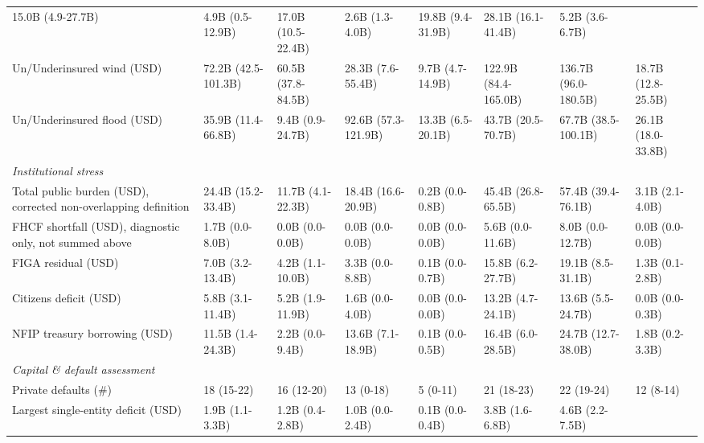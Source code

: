 \documentclass[fleqn,10pt]{wlscirep}
\begin{document}
\begin{landscape}
\begin{table}[htb!]
{\begin{tabular}{@{}llllllll@{}}
  15.0B (4.9-27.7B) &
  4.9B (0.5-12.9B) &
  17.0B (10.5-22.4B) &
  2.6B (1.3-4.0B) &
  19.8B (9.4-31.9B) &
  28.1B (16.1-41.4B) &
  5.2B (3.6-6.7B) \\
Un/Underinsured wind (USD) &
  72.2B (42.5-101.3B) &
  60.5B (37.8-84.5B) &
  28.3B (7.6-55.4B) &
  9.7B (4.7-14.9B) &
  122.9B (84.4-165.0B) &
  136.7B (96.0-180.5B) &
  18.7B (12.8-25.5B) \\
Un/Underinsured flood (USD) &
  35.9B (11.4-66.8B) &
  9.4B (0.9-24.7B) &
  92.6B (57.3-121.9B) &
  13.3B (6.5-20.1B) &
  43.7B (20.5-70.7B) &
  67.7B (38.5-100.1B) &
  26.1B (18.0-33.8B) \\
\midrule
\multicolumn{8}{l}{\textit{Institutional stress}} \\
Total public burden (USD), corrected non-overlapping definition &
  24.4B (15.2-33.4B) &
  11.7B (4.1-22.3B) &
  18.4B (16.6-20.9B) &
  0.2B (0.0-0.8B) &
  45.4B (26.8-65.5B) &
  57.4B (39.4-76.1B) &
  3.1B (2.1-4.0B) \\
FHCF shortfall (USD), diagnostic only, not summed above &
  1.7B (0.0-8.0B) &
  0.0B (0.0-0.0B) &
  0.0B (0.0-0.0B) &
  0.0B (0.0-0.0B) &
  5.6B (0.0-11.6B) &
  8.0B (0.0-12.7B) &
  0.0B (0.0-0.0B) \\
FIGA residual (USD) &
  7.0B (3.2-13.4B) &
  4.2B (1.1-10.0B) &
  3.3B (0.0-8.8B) &
  0.1B (0.0-0.7B) &
  15.8B (6.2-27.7B) &
  19.1B (8.5-31.1B) &
  1.3B (0.1-2.8B) \\
Citizens deficit (USD) &
  5.8B (3.1-11.4B) &
  5.2B (1.9-11.9B) &
  1.6B (0.0-4.0B) &
  0.0B (0.0-0.0B) &
  13.2B (4.7-24.1B) &
  13.6B (5.5-24.7B) &
  0.0B (0.0-0.3B) \\
NFIP treasury borrowing (USD) &
  11.5B (1.4-24.3B) &
  2.2B (0.0-9.4B) &
  13.6B (7.1-18.9B) &
  0.1B (0.0-0.5B) &
  16.4B (6.0-28.5B) &
  24.7B (12.7-38.0B) &
  1.8B (0.2-3.3B) \\
\hline
\textit{Capital \& default assessment} & & & & & & & \\
Private defaults (\#) &
  18 (15-22) &
  16 (12-20) &
  13 (0-18) &
  5 (0-11) &
  21 (18-23) &
  22 (19-24) &
  12 (8-14) \\
Largest single-entity deficit (USD) &
  1.9B (1.1-3.3B) &
  1.2B (0.4-2.8B) &
  1.0B (0.0-2.4B) &
  0.1B (0.0-0.4B) &
  3.8B (1.6-6.8B) &
  4.6B (2.2-7.5B) &

\end{tabular}}
\end{table}
\end{landscape}
\end{document}
